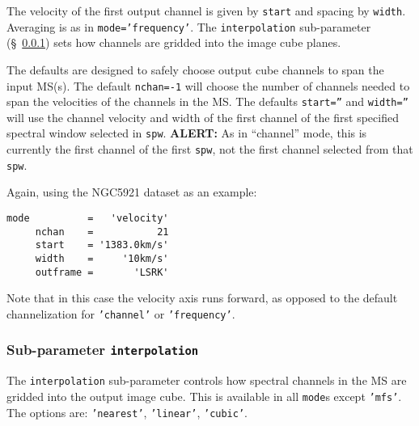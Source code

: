 The velocity of the first output channel is given by {\tt start}
and spacing by {\tt width}.  Averaging is as in
{\tt mode='frequency'}.  The {\tt interpolation} sub-parameter
(\S~\ref{section:im.pars.mode.interpolation}) sets how channels are
gridded into the image cube planes.

The defaults are designed to safely choose output cube channels to
span the input MS(s).
The default {\tt nchan=-1} will choose the number of channels needed
to span the velocities of the channels in the MS.  
The defaults {\tt start=''} and {\tt width=''} will use the channel
velocity and width of the first channel of the first specified
spectral window selected in {\tt spw}.  {\bf ALERT:} As in ``channel''
mode, this is currently the first channel of the first {\tt spw}, not
the first channel selected from that {\tt spw}.  

Again, using the NGC5921 dataset as an example:
\small
\begin{verbatim}
mode          =   'velocity'        
     nchan    =           21        
     start    = '1383.0km/s'      
     width    =     '10km/s'        
     outframe =       'LSRK'
\end{verbatim}
\normalsize
Note that in this case the velocity axis runs forward, as opposed to
the default channelization for {\tt 'channel'} or {\tt 'frequency'}.


\subsubsection{Sub-parameter {\tt interpolation} }
\label{section:im.pars.mode.interpolation}

The {\tt interpolation} sub-parameter controls how spectral channels
in the MS are gridded into the output image cube.  This is available 
in all {\tt mode}s except {\tt 'mfs'}.  The options are: 
{\tt 'nearest'}, {\tt 'linear'}, {\tt 'cubic'}.

